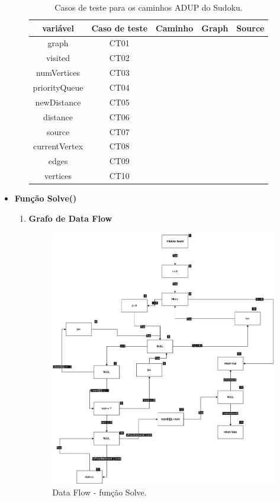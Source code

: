 \documentclass{article}
\begin{document}
\begin{itemize}
\begin{enumerate}
\begin{table}[H]
\begin{tabular}{|c|c|c|p{4cm}|c|}
        \hline
        \textbf{variável} & \textbf{Caso de teste} & \textbf{Caminho} & \textbf{Graph} & \textbf{Source} \\ \hline
        graph & CT01 &  &  &  \\ \hline
        visited & CT02 &  &    &  \\ \hline
        numVertices & CT03 &  &  &  \\ \hline
        priorityQueue & CT04 &   & &  \\ \hline
        newDistance & CT05 &  &  &  \\ \hline
        distance & CT06 &    &  &  \\ \hline
        source & CT07 &  &    &  \\ \hline
        currentVertex & CT08  & &  &  \\ \hline
        edges & CT09 &  &   & \\ \hline
        vertices & CT10 &  &  &  \\ 

        \hline
    \end{tabular}
    \caption{Casos de teste para os caminhos ADUP do Sudoku.}
    \label{tab:tabela_exemplo}
\end{table}
\end{enumerate}
    \item\textbf{Função Solve()}
    
       
    \begin{enumerate}
        
        \item \textbf{Grafo de Data Flow}
    \begin{figure}[H]
    \centering
    \includegraphics[width=\textwidth]{Images/DataFlowSudoku.drawio.png}
    \caption{Data Flow - função Solve.} 
    \label{fig:DataFlow-Solve}


\end{figure}
\end{enumerate}
\end{itemize}
\end{document}
